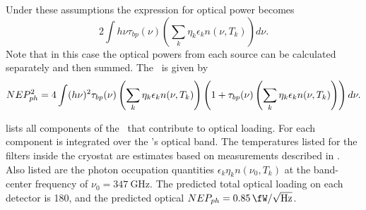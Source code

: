 Under these assumptions the expression for optical power becomes
\begin{equation} \label{eqn:ch4-opt-pow-all}
  2 \int h \nu \tau_{bp}(\nu) \left( \sum_k \eta_k \epsilon_k n(\nu,T_k) \right) d \nu.
\end{equation}
Note that in this case the optical powers from each source can be calculated separately and then summed.
The \NEPph\ is given by
\begin{equation} \label{eqn:ch4-nep-all}
  NEP_{ph}^2 = 4 \int (h \nu)^2 \tau_{bp}(\nu) \left( \sum_k \eta_k \epsilon_k n(\nu,T_k) \right) 
       \left( 1 + \tau_{bp}(\nu) \left( \sum_k \eta_k \epsilon_k n(\nu,T_k) \right)  \right) d \nu.
\end{equation}


 lists all components of the \Imager\ that contribute to optical loading.
For each component  is integrated over the \Imager's optical band.
The temperatures listed for the filters inside the cryostat are estimates based on measurements described in .
Also listed are the photon occupation quantities $\epsilon_k \eta_k n(\nu_0,T_k)$ at the band-center frequency of $\nu_0 = \SI{347}{\GHz}$.
The predicted total optical loading on each detector is \SI{180}{\pW}, and the predicted optical $NEP_{ph} = \Pnoisef{0.85}$.

